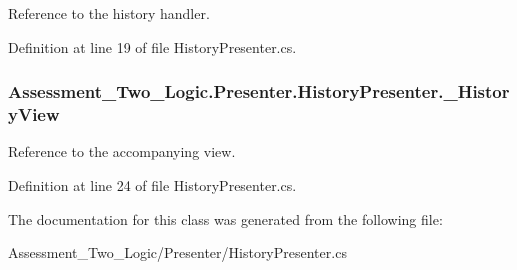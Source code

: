 Reference to the history handler. 



Definition at line 19 of file HistoryPresenter.cs.

\hypertarget{class_assessment___two___logic_1_1_presenter_1_1_history_presenter_a9103acb482d8a1e8ed29be4f9b6a6944}{
\subsubsection[{\_\-HistoryView}]{ {\bf Assessment\_\-Two\_\-Logic.Presenter.HistoryPresenter.\_\-HistoryView}}}
\label{class_assessment___two___logic_1_1_presenter_1_1_history_presenter_a9103acb482d8a1e8ed29be4f9b6a6944}


Reference to the accompanying view. 



Definition at line 24 of file HistoryPresenter.cs.



The documentation for this class was generated from the following file:\begin{DoxyCompactItemize}
\item 
Assessment\_\-Two\_\-Logic/Presenter/HistoryPresenter.cs\end{DoxyCompactItemize}
